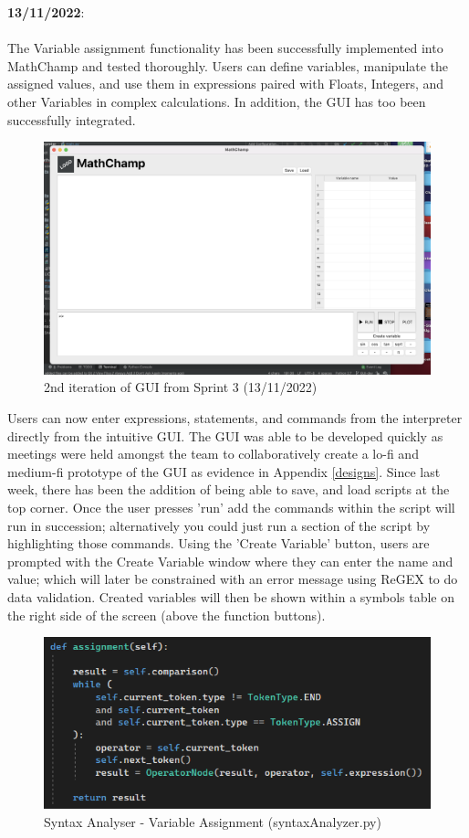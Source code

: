 \documentclass[a4paper, oneside, 11pt]{report}
\begin{document}
\textbf{13/11/2022}:\\ \\

The Variable assignment functionality has been successfully implemented into MathChamp and tested thoroughly. Users can define variables, manipulate the assigned values, and use them in expressions paired with Floats, Integers, and other Variables in complex calculations. In addition, the GUI has too been successfully integrated. 

\begin{figure}[H]
    \centering
    \includegraphics[width=12cm]{2nd_screenshot.png}
    \caption{2nd iteration of GUI from Sprint 3 (13/11/2022)}
    \label{fig:2ndGUI}
\end{figure}

Users can now enter expressions, statements, and commands from the interpreter directly from the intuitive GUI. The GUI was able to be developed quickly as meetings were held amongst the team to collaboratively create a lo-fi and medium-fi prototype of the GUI as evidence in Appendix \ref{designs}. Since last week, there has been the addition of being able to save, and load scripts at the top corner. Once the user presses 'run' add the commands within the script will run in succession; alternatively you could just run a section of the script by highlighting those commands. Using the 'Create Variable' button, users are prompted with the Create Variable window where they can enter the name and value; which will later be constrained with an error message using ReGEX to do data validation. Created variables will then be shown within a symbols table on the right side of the screen (above the function buttons).

\begin{figure}[h]
    \centering
    \includegraphics[width=13.0cm]{variableAssignment.png}
    \caption{Syntax Analyser - Variable Assignment (syntaxAnalyzer.py)}
    \label{fig:bnf}
\end{figure}
\end{document}
